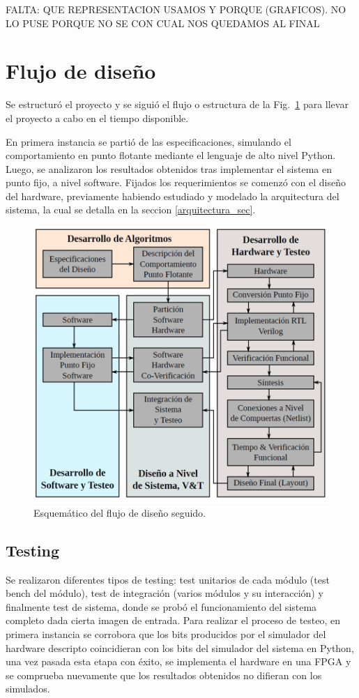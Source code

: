 FALTA: QUE REPRESENTACION USAMOS Y  PORQUE (GRAFICOS). NO LO PUSE PORQUE NO SE CON CUAL NOS QUEDAMOS AL FINAL

\section{Flujo de diseño} \label{flujo_subsecc}

Se estructuró el proyecto y se siguió el flujo o estructura de la
Fig.~\ref{design_flow} para llevar el proyecto a cabo en el tiempo disponible.

En primera instancia se partió de las especificaciones, simulando el comportamiento en punto flotante mediante el lenguaje de alto nivel Python. Luego, se analizaron los resultados obtenidos tras implementar el sistema en punto fijo, a nivel software. 
Fijados los requerimientos se comenzó con el diseño del hardware,
previamente habiendo estudiado y modelado la arquitectura del sistema, la cual
se detalla en la seccion \ref{arquitectura_sec}.

\begin{figure}
\centering
\includegraphics{flujo_de_dis.png}
\caption{Esquemático del flujo de diseño seguido.}
\label{design_flow}
\end{figure}

\subsection{Testing}

Se realizaron diferentes tipos de testing: test
unitarios de cada módulo (test bench del módulo), test de integración (varios
módulos y su interacción) y finalmente test de sistema, donde se probó el
funcionamiento del sistema completo dada cierta imagen de entrada. Para realizar
el proceso de testeo, en primera instancia se corrobora que los bits producidos
por el simulador del hardware descripto coincidieran con los bits del simulador
del sistema en Python, una vez pasada esta etapa con éxito, se implementa el
hardware en una FPGA y se comprueba nuevamente que los resultados obtenidos no
difieran con los simulados.

